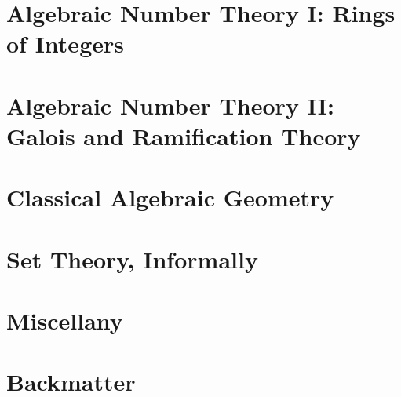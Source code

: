 \documentclass[11pt]{scrreprt}
\begin{document}
\part{Algebraic Number Theory I: Rings of Integers}





\part{Algebraic Number Theory II: Galois and Ramification Theory}




\part{Classical Algebraic Geometry}

\part{Set Theory, Informally}








\part{Miscellany}
\appendix


\part{Backmatter}


\clearpage
\printbibliography



%
%
\end{document}
